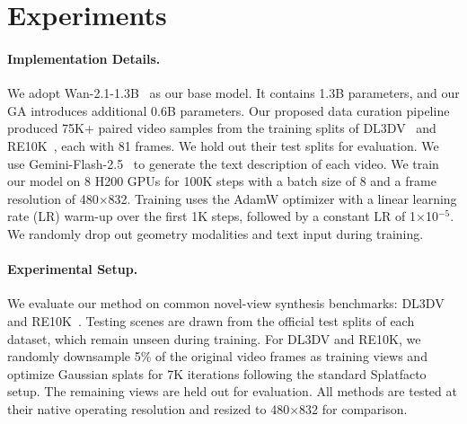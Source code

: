
\section{Experiments}
\paragraph{Implementation Details.}
We adopt Wan-2.1-1.3B~\cite{wan2025} as our base model. It contains 1.3B parameters, and our GA introduces additional 0.6B parameters. Our proposed data curation pipeline produced 75K+ paired video samples from the training splits of DL3DV~\cite{ling2024dl3dv} and RE10K~\cite{re10k}, each with 81 frames.  We hold out their test splits for evaluation. We use Gemini-Flash-2.5~\cite{gemini2.5flash} to generate the text description of each video. We train our model on 8 H200 GPUs for 100K steps with a batch size of 8 and a frame resolution of 480$\times$832. Training uses the AdamW optimizer with a linear learning rate (LR) warm-up over the first 1K steps, followed by a constant LR of 1$\times$10$^{-5}$. We randomly drop out geometry modalities and text input during training. 


\paragraph{Experimental Setup.} We evaluate our method on common novel-view synthesis benchmarks: DL3DV~\cite{ling2024dl3dv} and RE10K~\cite{re10k}.
Testing scenes are drawn from the official test splits of each dataset, which remain unseen during training. 
For DL3DV and RE10K, we randomly downsample 5\% of the original video frames as training views and optimize Gaussian splats for 7K iterations following the standard Splatfacto~\cite{ye2025gsplat} setup. The remaining views are held out for evaluation. All methods are tested at their native operating resolution and resized to 480$\times$832 for comparison.




